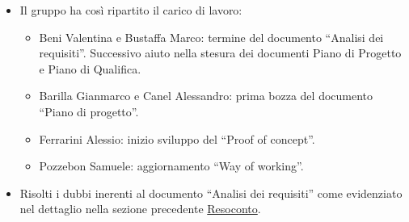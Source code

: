 \begin{itemize}
	\item Il gruppo ha così ripartito il carico di lavoro:
	\begin{itemize}
		\item Beni Valentina e Bustaffa Marco: termine del documento ``Analisi dei requisiti''. Successivo aiuto nella stesura dei documenti Piano di Progetto e Piano di Qualifica. 
		\item Barilla Gianmarco e Canel Alessandro: prima bozza del documento ``Piano di progetto''.
		\item Ferrarini Alessio: inizio sviluppo del ``Proof of concept''.
		\item Pozzebon Samuele: aggiornamento ``Way of working''.
	\end{itemize}
	\item Risolti i dubbi inerenti al documento ``Analisi dei requisiti'' come evidenziato nel dettaglio nella sezione precedente \hyperref[sec:Resoconto]{Resoconto}.
\end{itemize}